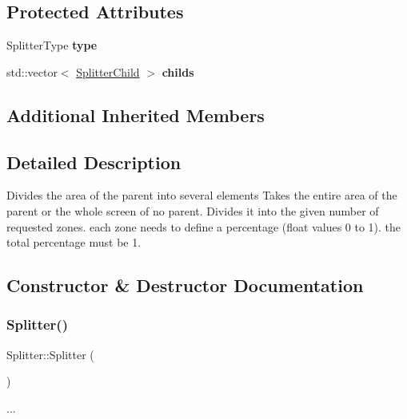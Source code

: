 \subsection*{Protected Attributes}
\begin{DoxyCompactItemize}
\item 
\mbox{\label{class_splitter_a80d42af90ddecf61e0bd988fa0abc877}} 
Splitter\+Type {\bfseries type}
\item 
\mbox{\label{class_splitter_a1fe850cd6ee1699cc00ca16b2b2a2992}} 
std\+::vector$<$ \hyperlink{struct_splitter_child}{Splitter\+Child} $>$ {\bfseries childs}
\end{DoxyCompactItemize}
\subsection*{Additional Inherited Members}


\subsection{Detailed Description}
Divides the area of the parent into several elements  Takes the entire area of the parent or the whole screen of no parent. Divides it into the given number of requested zones. each zone needs to define a percentage (float values 0 to 1). the total percentage must be 1. 

\subsection{Constructor \& Destructor Documentation}
\mbox{\label{class_splitter_ac62b02b8374ebe8dfdf6c34fbd59c2a1}} 
\subsubsection{\texorpdfstring{Splitter()}{Splitter()}}
{\footnotesize\ttfamily Splitter\+::\+Splitter (\begin{DoxyParamCaption}{ }\end{DoxyParamCaption})}

... \mbox{\label{class_splitter_a43e6a2b28ecf48a2127840a5fbf5fb3f}} 
